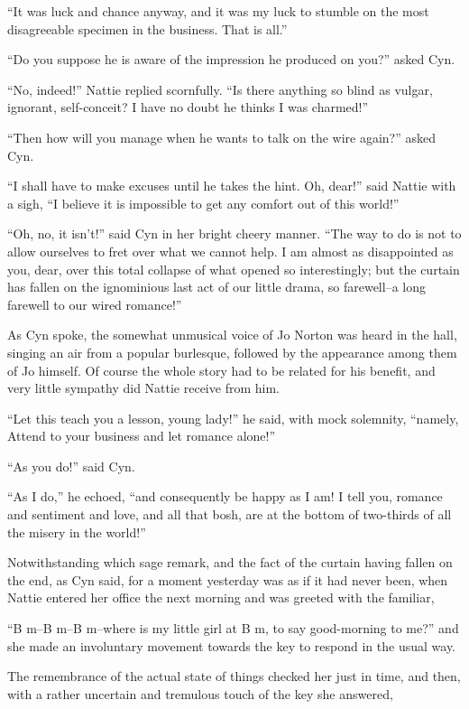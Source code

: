 ``It was luck and chance anyway, and it was my luck to stumble on the
most disagreeable specimen in the business. That is all.''

``Do you suppose he is aware of the impression he produced on you?'' asked
Cyn.

``No, indeed!'' Nattie replied scornfully. ``Is there anything so blind as
vulgar, ignorant, self-conceit? I have no doubt he thinks I was
charmed!''

``Then how will you manage when he wants to talk on the wire again?''
asked Cyn.

``I shall have to make excuses until he takes the hint. Oh, dear!'' said
Nattie with a sigh, ``I believe it is impossible to get any comfort out
of this world!''

``Oh, no, it isn't!'' said Cyn in her bright cheery manner. ``The way to do
is not to allow ourselves to fret over what we cannot help. I am almost
as disappointed as you, dear, over this total collapse of what opened so
interestingly; but the curtain has fallen on the ignominious last act of
our little drama, so farewell--a long farewell to our wired romance!''

As Cyn spoke, the somewhat unmusical voice of Jo Norton was heard in the
hall, singing an air from a popular burlesque, followed by the
appearance among them of Jo himself. Of course the whole story had to be
related for his benefit, and very little sympathy did Nattie receive
from him.

``Let this teach you a lesson, young lady!'' he said, with mock solemnity,
``namely, Attend to your business and let romance alone!''

``As you do!'' said Cyn.

``As I do,'' he echoed, ``and consequently be happy as I am! I tell you,
romance and sentiment and love, and all that bosh, are at the bottom of
two-thirds of all the misery in the world!''

Notwithstanding which sage remark, and the fact of the curtain having
fallen on the end, as Cyn said, for a moment yesterday was as if it had
never been, when Nattie entered her office the next morning and was
greeted with the familiar,

``B m--B m--B m--where is my little girl at B m, to say good-morning to
me?'' and she made an involuntary movement towards the key to respond in
the usual way.

The remembrance of the actual state of things checked her just in time,
and then, with a rather uncertain and tremulous touch of the key she
answered,

